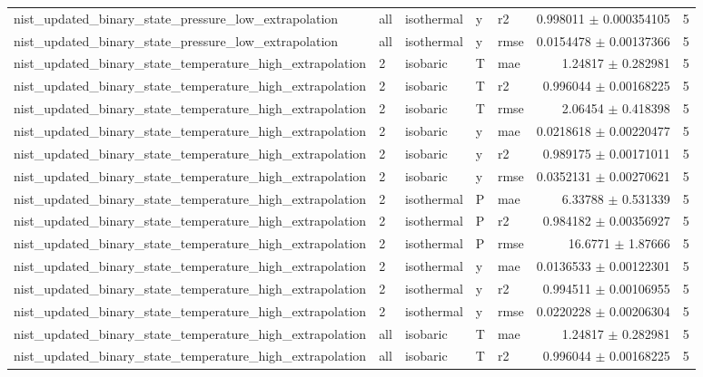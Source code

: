 \begin{tabular}{lllllrr}
nist\_updated\_binary\_state\_pressure\_low\_extrapolation & all & isothermal & y & r2 & 0.998011 $\pm$ 0.000354105 & 5 \\
nist\_updated\_binary\_state\_pressure\_low\_extrapolation & all & isothermal & y & rmse & 0.0154478 $\pm$ 0.00137366 & 5 \\
nist\_updated\_binary\_state\_temperature\_high\_extrapolation & 2 & isobaric & T & mae & 1.24817 $\pm$ 0.282981 & 5 \\
nist\_updated\_binary\_state\_temperature\_high\_extrapolation & 2 & isobaric & T & r2 & 0.996044 $\pm$ 0.00168225 & 5 \\
nist\_updated\_binary\_state\_temperature\_high\_extrapolation & 2 & isobaric & T & rmse & 2.06454 $\pm$ 0.418398 & 5 \\
nist\_updated\_binary\_state\_temperature\_high\_extrapolation & 2 & isobaric & y & mae & 0.0218618 $\pm$ 0.00220477 & 5 \\
nist\_updated\_binary\_state\_temperature\_high\_extrapolation & 2 & isobaric & y & r2 & 0.989175 $\pm$ 0.00171011 & 5 \\
nist\_updated\_binary\_state\_temperature\_high\_extrapolation & 2 & isobaric & y & rmse & 0.0352131 $\pm$ 0.00270621 & 5 \\
nist\_updated\_binary\_state\_temperature\_high\_extrapolation & 2 & isothermal & P & mae & 6.33788 $\pm$ 0.531339 & 5 \\
nist\_updated\_binary\_state\_temperature\_high\_extrapolation & 2 & isothermal & P & r2 & 0.984182 $\pm$ 0.00356927 & 5 \\
nist\_updated\_binary\_state\_temperature\_high\_extrapolation & 2 & isothermal & P & rmse & 16.6771 $\pm$ 1.87666 & 5 \\
nist\_updated\_binary\_state\_temperature\_high\_extrapolation & 2 & isothermal & y & mae & 0.0136533 $\pm$ 0.00122301 & 5 \\
nist\_updated\_binary\_state\_temperature\_high\_extrapolation & 2 & isothermal & y & r2 & 0.994511 $\pm$ 0.00106955 & 5 \\
nist\_updated\_binary\_state\_temperature\_high\_extrapolation & 2 & isothermal & y & rmse & 0.0220228 $\pm$ 0.00206304 & 5 \\
nist\_updated\_binary\_state\_temperature\_high\_extrapolation & all & isobaric & T & mae & 1.24817 $\pm$ 0.282981 & 5 \\
nist\_updated\_binary\_state\_temperature\_high\_extrapolation & all & isobaric & T & r2 & 0.996044 $\pm$ 0.00168225 & 5 \\

\end{tabular}
